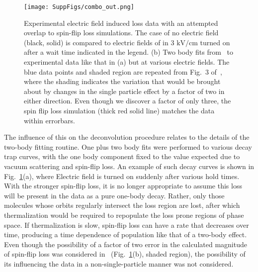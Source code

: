 \documentclass[%
 reprint,
 amsmath,amssymb,
 aps,
pra,
]{revtex4-1}
\begin{document}
\begin{figure}
\texttt{[image: SuppFigs/combo\_out.png]} 
\caption{Experimental electric field induced loss data with an attempted overlap to spin-flip loss simulations. The case of no electric field (black, solid) is compared to electric fields of in $3\text{ kV/cm}$ turned on after a wait time indicated in the legend. (b) Two body fits from~\cite{Stuhl2013} to experimental data like that in (a) but at various electric fields. The blue data points and shaded region are repeated from Fig.~3 of~\cite{Stuhl2013}, where the shading indicates the variation that would be brought about by changes in the single particle effect by a factor of two in either direction. Even though we discover a factor of only three, the spin flip loss simulation (thick red solid line) matches the data within errorbars.\label{fig:eil}}
\end{figure}

The influence of this on the deconvolution procedure relates to the details of the two-body fitting routine.
One plus two body fits were performed to various decay trap curves, with the one body component fixed to the value expected due to vacuum scattering and spin-flip loss.
An example of  such decay curves is shown in Fig.~\ref{fig:eil}(a), where Electric field is turned on suddenly after various hold times.
With the stronger spin-flip loss, it is no longer appropriate to assume this loss will be present in the data as a pure one-body decay.
Rather, only those molecules whose orbits regularly intersect the loss region are lost, after which thermalization would be required to repopulate the loss prone regions of phase space.
If thermalization is slow, spin-flip loss can have a rate that decreases over time, producing a time dependence of population like that of a two-body effect.
Even though the possibility of a factor of two error in the calculated magnitude of spin-flip loss was considered in~\cite{Stuhl2013} (Fig.~\ref{fig:eil}(b), shaded region), the possibility of its influencing the data in a non-single-particle manner was not considered.
\end{document}
